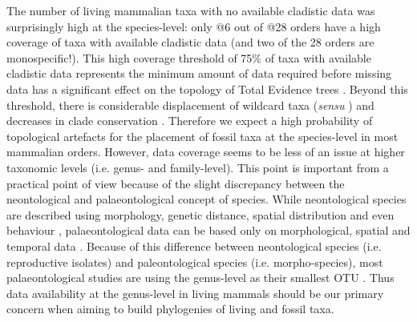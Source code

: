 \documentclass[12pt,letterpaper]{article}
\begin{document}
The number of living mammalian taxa with no available cladistic data was surprisingly high at the species-level: only @6 out of @28 orders have a high coverage of taxa with available cladistic data (and two of the 28 orders are monospecific!).
This high coverage threshold of 75\% of taxa with available cladistic data represents the minimum amount of data required before missing data has a significant effect on the topology of Total Evidence trees \citep{GuillermeCooper}.
Beyond this threshold, there is considerable displacement of wildcard taxa (\textit{sensu} \citep{kearneyfragmentary2002}) and decreases in clade conservation \citep{GuillermeCooper}.
Therefore we expect a high probability of topological artefacts for the placement of fossil taxa at the species-level in most mammalian orders.
However, data coverage seems to be less of an issue at higher taxonomic levels (i.e. genus- and family-level).
This point is important from a practical point of view because of the slight discrepancy between the neontological and palaeontological concept of species.
While neontological species are described using morphology, genetic distance, spatial distribution and even behaviour \citep[e.g.][]{kellymolecular2014}, palaeontological data can be based only on morphological, spatial and temporal data \citep[e.g.][]{ni2013oldest}.
Because of this difference between neontological species (i.e. reproductive isolates) and paleontological species (i.e. morpho-species), most palaeontological studies are using the genus-level as their smallest OTU \citep[e.g.][]{ni2013oldest,O'Leary08022013}.
Thus data availability at the genus-level in living mammals should be our primary concern when aiming to build phylogenies of living and fossil taxa.
\end{document}
